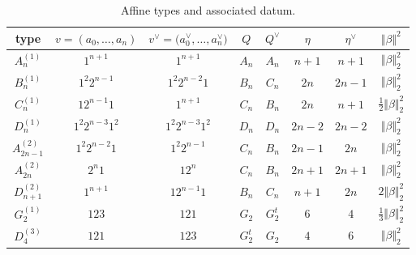 \documentclass[10pt,a4paper]{amsart}
\numberwithin{equation}{section}
\begin{document}
\begin{table}[h]\centering \renewcommand{\arraystretch}{1.32}\caption{Affine types and associated datum.}
\begin{tabular}{|c|c|c|c|c|c|c|c|}
\hline
type & $v=(a_{0},\dots ,a_{n})$ & $v^{\vee }=\bigl(a_{0}^{\vee },\dots
,a_{n}^{\vee }\bigr)$ & $Q$ & $Q^{\vee }$ & $\eta $ & $\eta ^{\vee }$ & $%
 \Vert \beta  \Vert ^{2}$ \\ \hline
$A_{n}^{(1)}$ & $1^{n+1}$ & $1^{n+1}$ & $A_{n}$ & $A_{n}$ & $n+1$ & $n+1$ & $%
 \Vert \beta  \Vert _{2}^{2}$ \\ \hline
$B_{n}^{(1)}$ & $1^{2}2^{n-1}$ & $1^{2}2^{n-2}1$ & $B_{n}$ & $C_{n}$ & $2n$
& $2n-1$ & $ \Vert \beta  \Vert _{2}^{2}$ \\ \hline
$C_{n}^{(1)}$ & $12^{n-1}1$ & $1^{n+1}$ & $C_{n}$ & $B_{n}$ & $2n$ & $n+1$ &
$\frac{1}{2} \Vert \beta  \Vert _{2}^{2}$ \\ \hline
$D_{n}^{(1)}$ & $1^{2}2^{n-3}1^{2}$ & $1^{2}2^{n-3}1^{2}$ & $D_{n}$ & $D_{n}$
& $2n-2$ & $2n-2$ & $ \Vert \beta  \Vert _{2}^{2}$ \\ \hline
$A_{2n-1}^{(2)}$ & $1^{2}2^{n-2}1$ & $1^{2}2^{n-1}$ & $C_{n}$ & $B_{n}$ & $%
2n-1$ & $2n$ & $ \Vert \beta  \Vert _{2}^{2}$ \\ \hline
$A_{2n}^{(2)}$ & $2^{n}1$ & $12^{n}$ & $C_{n}$ & $B_{n}$ & $2n+1$ & $2n+1$ &
$ \Vert \beta  \Vert _{2}^{2}$ \\ \hline
$D_{n+1}^{(2)}$ & $1^{n+1}$ & $12^{n-1}1$ & $B_{n}$ & $C_{n}$ & $n+1$ & $2n$
& $2 \Vert \beta  \Vert _{2}^{2}$ \\ \hline
$G_{2}^{(1)}$ & $123$ & $121$ & $G_{2}$ & $G_{2}^{t}$ & $6$ & $4$ & $\frac{1%
}{3} \Vert \beta  \Vert _{2}^{2}$ \\ \hline
$D_{4}^{(3)}$ & $121$ & $123$ & $G_{2}^{t}$ & $G_{2}$ & $4$ & $6$ & $%
 \Vert \beta  \Vert _{2}^{2}$ \\ \hline
\end{tabular}
\end{table}
\end{document}
